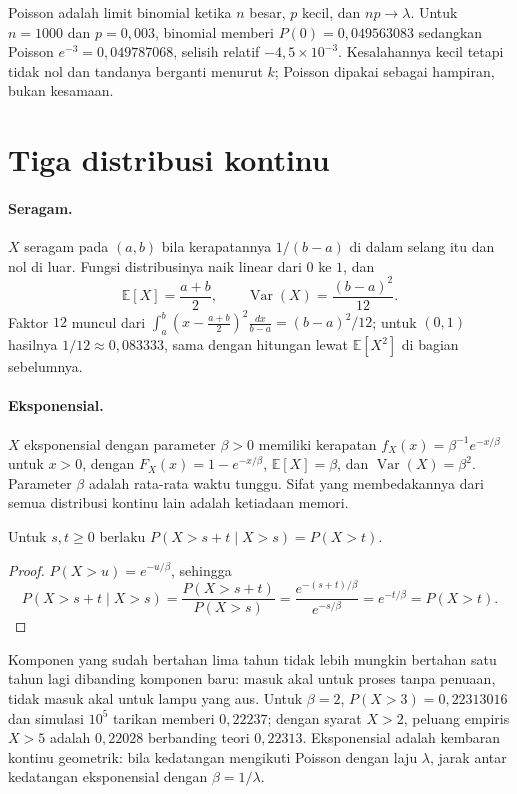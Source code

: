 Poisson adalah limit binomial ketika $n$ besar, $p$ kecil, dan $np\to\lambda$. Untuk
$n=1000$ dan $p=0{,}003$, binomial memberi $P(0)=0{,}049563083$ sedangkan Poisson
$e^{-3}=0{,}049787068$, selisih relatif $-4{,}5\times10^{-3}$. Kesalahannya kecil tetapi
tidak nol dan tandanya berganti menurut $k$; Poisson dipakai sebagai hampiran, bukan
kesamaan.

\section{Tiga distribusi kontinu}

\paragraph{Seragam.} $X$ seragam pada $(a,b)$ bila kerapatannya $1/(b-a)$ di dalam
selang itu dan nol di luar. Fungsi distribusinya naik linear dari $0$ ke $1$, dan
\[
\mathbb{E}[X]=\frac{a+b}{2},\qquad
\operatorname{Var}(X)=\frac{(b-a)^2}{12}.
\]
Faktor $12$ muncul dari $\int_a^b(x-\tfrac{a+b}{2})^2\frac{dx}{b-a}=(b-a)^2/12$; untuk
$(0,1)$ hasilnya $1/12\approx0{,}083333$, sama dengan hitungan lewat
$\mathbb{E}[X^2]$ di bagian sebelumnya.

\paragraph{Eksponensial.} $X$ eksponensial dengan parameter $\beta>0$ memiliki
kerapatan $f_X(x)=\beta^{-1}e^{-x/\beta}$ untuk $x>0$, dengan
$F_X(x)=1-e^{-x/\beta}$, $\mathbb{E}[X]=\beta$, dan $\operatorname{Var}(X)=\beta^2$.
Parameter $\beta$ adalah rata-rata waktu tunggu. Sifat yang membedakannya dari semua
distribusi kontinu lain adalah ketiadaan memori.

\begin{proposisi}
Untuk $s,t\ge0$ berlaku $P(X>s+t\mid X>s)=P(X>t)$.
\end{proposisi}

\begin{proof}
$P(X>u)=e^{-u/\beta}$, sehingga
\[
P(X>s+t\mid X>s)=\frac{P(X>s+t)}{P(X>s)}
=\frac{e^{-(s+t)/\beta}}{e^{-s/\beta}}=e^{-t/\beta}=P(X>t).
\]
\end{proof}

Komponen yang sudah bertahan lima tahun tidak lebih mungkin bertahan satu tahun lagi
dibanding komponen baru: masuk akal untuk proses tanpa penuaan, tidak masuk akal untuk
lampu yang aus. Untuk $\beta=2$, $P(X>3)=0{,}22313016$ dan simulasi $10^5$ tarikan
memberi $0{,}22237$;
dengan syarat $X>2$, peluang empiris $X>5$ adalah $0{,}22028$ berbanding teori
$0{,}22313$. Eksponensial adalah kembaran kontinu geometrik: bila kedatangan mengikuti
Poisson dengan laju $\lambda$, jarak antar kedatangan eksponensial dengan
$\beta=1/\lambda$.

